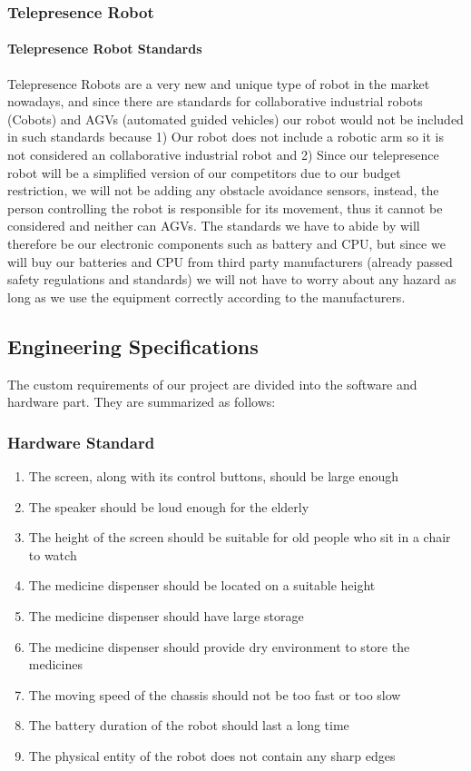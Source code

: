 \documentclass[12pt]{article}
\begin{document}
{\subsubsection{Telepresence Robot}
\paragraph{Telepresence Robot Standards}
Telepresence Robots are a very new and unique type of robot in the market nowadays, and since there are standards for collaborative industrial robots (Cobots) and AGVs (automated guided vehicles) our robot would not be included in such standards because 1) Our robot does not include a robotic arm so it is not considered an collaborative industrial robot and 2) Since our telepresence robot will be a simplified version of our competitors due to our budget restriction, we will not be adding any obstacle avoidance sensors, instead, the person controlling the robot is responsible for its movement, thus it cannot be considered and neither can AGVs. The standards we have to abide by will therefore be our electronic components such as battery and CPU, but since we will buy our batteries and CPU from third party manufacturers (already passed safety regulations and standards) we will not have to worry about any hazard as long as we use the equipment correctly according to the manufacturers.
\subsection{Engineering Specifications}
The custom requirements of our project are divided into the software and hardware part. They are summarized as follows:
\subsubsection{Hardware Standard}
\begin{enumerate}
	\item The screen, along with its control buttons, should be large enough 
	\item The speaker should be loud enough for the elderly 
	\item The height of the screen should be suitable for old people who sit in a chair to watch 
	\item The medicine dispenser should be located on a suitable height 
	\item The medicine dispenser should have large storage 
	\item The medicine dispenser should provide dry environment to store the medicines
	\item The moving speed of the chassis should not be too fast or too slow
	\item The battery duration of the robot should last a long time 
	\item The physical entity of the robot does not contain any sharp edges 
\end{enumerate}
}
\end{document}

